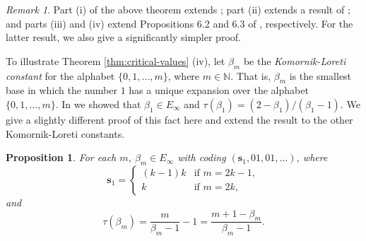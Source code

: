 \documentclass[12pt]{amsart}
\newtheorem{proposition}[theorem]{Proposition}
\theoremstyle{definition}
\theoremstyle{remark}
\newtheorem{remark}[theorem]{Remark}
\numberwithin{equation}{section}
\newcommand{\N}{\ensuremath{\mathbb{N}}}
\newcommand{\s}{ {\mathbf{s}}}
\newcommand{\la}{\lambda}
\newcommand{\f}{\infty}
\newcommand{\al}{\alpha}
\begin{document}
{\begin{remark}
Part (i) of the above theorem extends \cite[Theorem 2]{Allaart-Kong-2021}; part (ii) extends a result of \cite{Kalle-Kong-Langeveld-Li-18}; and parts (iii) and (iv) extend Propositions 6.2 and 6.3 of \cite{Allaart-Kong-2021}, respectively. For the latter result, we also give a significantly simpler proof.
\end{remark}

To illustrate Theorem \ref{thm:critical-values} (iv), let $\beta_m$ be the {\em Komornik-Loreti constant} for the alphabet $\{0,1,\dots,m\}$, where $m\in\N$. That is, $\beta_m$ is the smallest base in which the number $1$ has a unique expansion over the alphabet $\{0,1,\dots,m\}$. In \cite{Allaart-Kong-2021} we showed that $\beta_1\in E_\f$ and $\tau(\beta_1)=(2-\beta_1)/(\beta_1-1)$. We give a slightly different proof of this fact here and extend the result to the other Komornik-Loreti constants.


\begin{proposition} \label{prop:K-L}
For each $m$, $\beta_m\in E_\f$ with coding $(\s_1,01,01,\dots)$, where
\[
\s_1=\begin{cases}
(k-1)k & \mbox{if $m=2k-1$},\\
k & \mbox{if $m=2k$},
\end{cases}
\]
and
\[
\tau(\beta_m)=\frac{m}{\beta_m-1}-1=\frac{m+1-\beta_m}{\beta_m-1}.
\]
\end{proposition}

}
\end{document}

